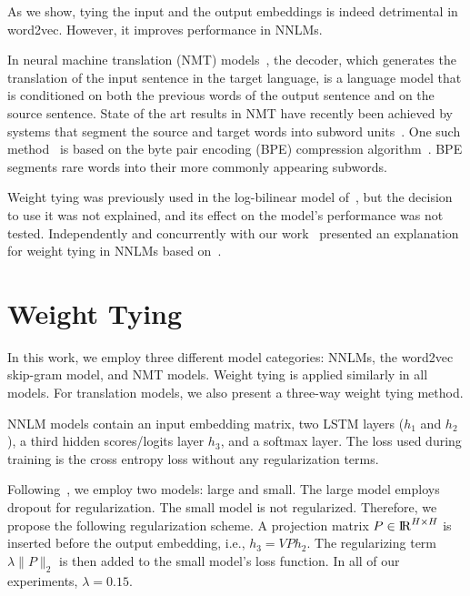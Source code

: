 \documentclass[11pt]{article}
\begin{document}
As we show, tying the input and the output embeddings is indeed detrimental in word2vec. However, it improves performance in NNLMs.

%
In neural machine translation (NMT) models~\cite{kalchbrenner2013recurrent,cho2014learning,sutskever2014sequence,learn2align}, the decoder, which generates the translation of the input sentence in the target language, is a language model that is conditioned on both the previous words of the output sentence and on the source sentence. State of the art results in NMT have recently been achieved by systems that segment the source and target words into subword units~\cite{edinburghWMT}.  One such method~\cite{bpe} is based on the byte pair encoding (BPE) compression algorithm~\cite{gage94}.  BPE segments rare words into their more commonly appearing subwords. 

Weight tying was previously used in the log-bilinear model of~\cite{mnih2009scalable}, but the decision to use it was not explained, and its effect on the model's performance was not tested. 
Independently and concurrently with our work~\cite{socher16} presented an explanation for weight tying in NNLMs based on~\cite{hinton2015distilling}.
%

\section{Weight Tying}
\label{sec:wt}
In this work, we employ three different model categories: NNLMs, the word2vec skip-gram model, and NMT models. Weight tying is applied similarly in all models. For translation models, we also present a three-way weight tying method.





NNLM models contain an input embedding matrix, two LSTM layers ($h_1$ and $h_2$), a third hidden scores/logits layer $h_3$, and a softmax layer. 
%
The loss used during training is the cross entropy loss without any regularization terms. 

Following~\cite{zaremba14}, we employ two models: large and small. The large model employs dropout for regularization. The small model is not regularized. Therefore, we propose the following regularization scheme. A projection matrix $P \in {\rm I\!R}^{H\times H}$ is inserted before the output embedding, i.e., $h_3 =  V P h_2  $. The regularizing term $\lambda \|P\|_2$ is then added to the small model's loss function. In all of our experiments, $\lambda=0.15$. 
\end{document}
